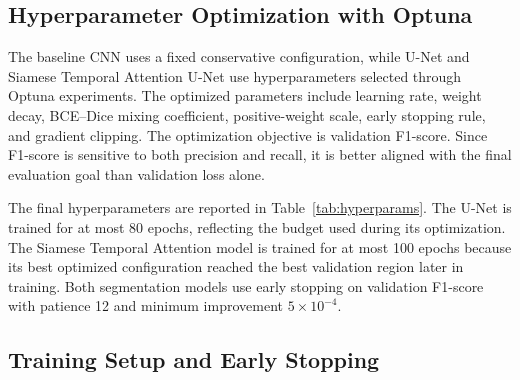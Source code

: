 \documentclass[11pt,a4paper]{article}
\begin{document}
\subsection{Hyperparameter Optimization with Optuna}

The baseline CNN uses a fixed conservative configuration, while U-Net and Siamese Temporal Attention U-Net use hyperparameters selected through Optuna experiments. The optimized parameters include learning rate, weight decay, BCE--Dice mixing coefficient, positive-weight scale, early stopping rule, and gradient clipping. The optimization objective is validation F1-score. Since F1-score is sensitive to both precision and recall, it is better aligned with the final evaluation goal than validation loss alone.

The final hyperparameters are reported in Table~\ref{tab:hyperparams}. The U-Net is trained for at most 80 epochs, reflecting the budget used during its optimization. The Siamese Temporal Attention model is trained for at most 100 epochs because its best optimized configuration reached the best validation region later in training. Both segmentation models use early stopping on validation F1-score with patience 12 and minimum improvement $5 \times 10^{-4}$.

\begin{table}[H]
  \centering
  \caption{Final training hyperparameters. The BCE weight is $\lambda_{\mathrm{BCE}}$ in Eq.~\eqref{eq:loss}. The Dice weight is $1-\lambda_{\mathrm{BCE}}$.}
  \label{tab:hyperparams}
\end{table}

\subsection{Training Setup and Early Stopping}
\end{document}
